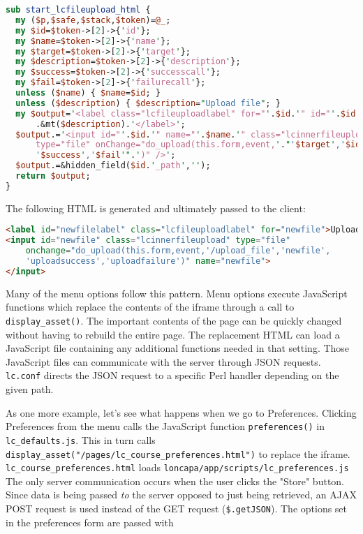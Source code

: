 \begin{lstlisting}[showstringspaces=false, language=Perl,frame=single,title=lc\_xml\_forms.pm]
sub start_lcfileupload_html {
  my ($p,$safe,$stack,$token)=@_;
  my $id=$token->[2]->{'id'};
  my $name=$token->[2]->{'name'};
  my $target=$token->[2]->{'target'};
  my $description=$token->[2]->{'description'};
  my $success=$token->[2]->{'successcall'};
  my $fail=$token->[2]->{'failurecall'};
  unless ($name) { $name=$id; }
  unless ($description) { $description="Upload file"; }
  my $output='<label class="lcfileuploadlabel" for="'.$id.'" id="'.$id.'label">'
      .&mt($description).'</label>';
  $output.='<input id="'.$id.'" name="'.$name.'" class="lcinnerfileupload"
      type="file" onChange="do_upload(this.form,event,'."'$target','$id',
      '$success','$fail'".')" />';
  $output.=&hidden_field($id.'_path','');
  return $output;
}
\end{lstlisting}

The following HTML is generated and ultimately passed to the client:

\begin{lstlisting}[showstringspaces=false, language=HTML,frame=single]
<label id="newfilelabel" class="lcfileuploadlabel" for="newfile">Upload file</label>
<input id="newfile" class="lcinnerfileupload" type="file" 
    onchange="do_upload(this.form,event,'/upload_file','newfile',
    'uploadsuccess','uploadfailure')" name="newfile">
</input> 
\end{lstlisting}




Many of the menu options follow this pattern.  Menu options execute JavaScript functions which replace the contents of the iframe through a call to {\tt display\_asset()}.  The important contents of the page can be quickly changed without having to rebuild the entire page.  The replacement HTML can load a JavaScript file containing any additional functions needed in that setting.  Those JavaScript files can communicate with the server through JSON requests. {\tt lc.conf} directs the JSON request to  a specific Perl handler depending on the given path.

As one more example, let's see what happens when we go to Preferences.  Clicking Preferences from the menu calls the JavaScript function {\tt preferences()} in {\tt lc\_defaults.js}.  This in turn calls {\tt display\_asset("/pages/lc\_course\_preferences.html")} to replace the iframe.  {\tt lc\_course\_preferences.html} loads {\tt loncapa/app/scripts/lc\_preferences.js}  The only server communication occurs when the user clicks the "Store" button.  Since data is being passed {\it to} the server opposed to just being retrieved, an AJAX POST request is used instead of the GET request ({\tt \$.getJSON}).  The options set in the preferences form are passed with 


